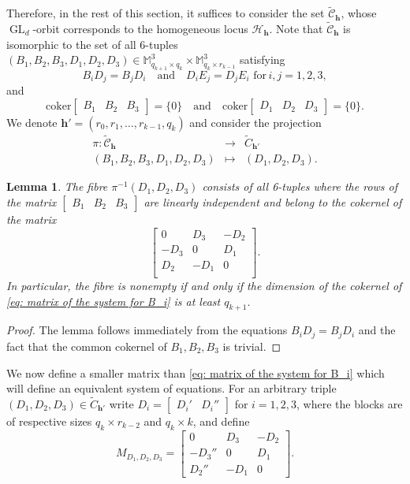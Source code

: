 \documentclass[11pt]{amsart}
\newtheorem{lemma}[thm]{Lemma}
\theoremstyle{definition}
\DeclareMathOperator{\GL}{GL}
\newcommand{\h}{\mathbf{h}}
\newcommand{\cH}{\mathscr{H}}
\newcommand{\tC}{\widetilde{C}}
\newcommand{\tcC}{\widetilde{\mathscr{C}}}
\begin{document}
Therefore, in the rest of this section, it suffices to consider the set $\tcC_\h$, whose $\GL_d$-orbit corresponds to the homogeneous locus $\cH_\h$.  Note that $\tcC_\h$ is isomorphic to the set of all 6-tuples $(B_1,B_2,B_3,D_1,D_2,D_3)\in \mathbb{M}_{q_{k+1}\times q_k}^3\times \mathbb{M}_{q_k\times r_{k-1}}^3$ satisfying
$$B_iD_j=B_jD_i\quad \mathrm{and}\quad D_iE_j=D_jE_i\, \, \mathrm{for}\, i,j=1,2,3,$$
and
$$\mathrm{coker}\begin{bmatrix} B_1 & B_2 & B_3 \end{bmatrix} =\{0\}\quad \mathrm{and}\quad \mathrm{coker}\begin{bmatrix} D_1 & D_2 & D_3 \end{bmatrix} =\{0\}.$$
We denote $\h'=(r_0,r_1,\ldots ,r_{k-1},q_k)$ and consider the projection
\begin{eqnarray*}
\pi\colon \tcC_\h&\to&\tC_{\h'}\\
(B_1,B_2,B_3,D_1,D_2,D_3)&\mapsto&(D_1,D_2,D_3).
\end{eqnarray*}

\begin{lemma}\label{lemma: fibre = cokernel}
The fibre $\pi^{-1}(D_1,D_2,D_3)$ consists of all 6-tuples where the rows of the matrix $\begin{bmatrix}B_1 & B_2 & B_3\end{bmatrix}$ are linearly independent and belong to the cokernel of the matrix
\begin{equation}\label{eq: matrix of the system for B_i}
\begin{bmatrix}
0 & D_3 & -D_2\\
-D_3 & 0 & D_1\\
D_2 & -D_1 & 0\\
\end{bmatrix}.
\end{equation}
In particular, the fibre is nonempty if and only if the dimension of the cokernel of \eqref{eq: matrix of the system for B_i} is at least $q_{k+1}$.
\end{lemma}

\begin{proof}
The lemma follows immediately from the equations $B_iD_j=B_jD_i$ and the fact that the common cokernel of $B_1,B_2,B_3$ is trivial.
\end{proof}

We now define a smaller matrix than \eqref{eq: matrix of the system for B_i} which will define an equivalent system of equations. For an arbitrary triple $(D_1,D_2,D_3)\in \tC_{\h'}$ write $D_i=\begin{bmatrix}D_i' & D_i''\end{bmatrix}$ for $i=1,2,3$, where the blocks are of respective sizes $q_k\times r_{k-2}$ and $q_k\times k$, and define
$$M_{D_1,D_2,D_3}=\begin{bmatrix}
0 & D_3 & -D_2\\
-D_3'' & 0 & D_1\\
D_2'' & -D_1 & 0
\end{bmatrix}.$$
\end{document}
